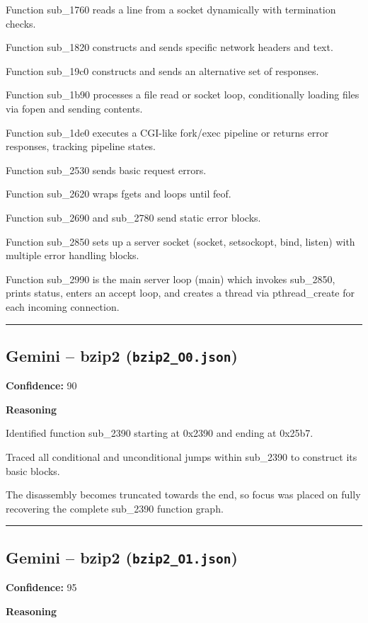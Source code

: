 Function sub\_1760 reads a line from a socket dynamically with termination checks.

Function sub\_1820 constructs and sends specific network headers and text.

Function sub\_19c0 constructs and sends an alternative set of responses.

Function sub\_1b90 processes a file read or socket loop, conditionally loading files via fopen and sending contents.

Function sub\_1de0 executes a CGI-like fork/exec pipeline or returns error responses, tracking pipeline states.

Function sub\_2530 sends basic request errors.

Function sub\_2620 wraps fgets and loops until feof.

Function sub\_2690 and sub\_2780 send static error blocks.

Function sub\_2850 sets up a server socket (socket, setsockopt, bind, listen) with multiple error handling blocks.

Function sub\_2990 is the main server loop (main) which invokes sub\_2850, prints status, enters an accept loop, and creates a thread via pthread\_create for each incoming connection.

\bigskip
\hrule
\bigskip

\subsection{Gemini -- bzip2 (\texttt{bzip2\_O0.json})}

\textbf{Confidence:} 90

\textbf{Reasoning}

Identified function sub\_2390 starting at 0x2390 and ending at 0x25b7.

Traced all conditional and unconditional jumps within sub\_2390 to construct its basic blocks.

The disassembly becomes truncated towards the end, so focus was placed on fully recovering the complete sub\_2390 function graph.

\bigskip
\hrule
\bigskip

\subsection{Gemini -- bzip2 (\texttt{bzip2\_O1.json})}

\textbf{Confidence:} 95

\textbf{Reasoning}

